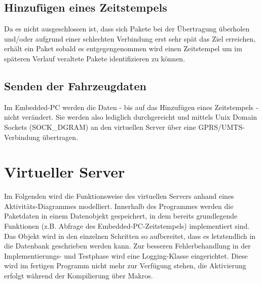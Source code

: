 \documentclass[fontsize = 12pt, paper = a4]{scrreprt}
\begin{document}
\subsection{Hinzufügen eines Zeitstempels}

Da es nicht ausgeschlossen ist, dass sich Pakete bei der Übertragung überholen und/oder aufgrund einer schlechten Verbindung erst sehr spät das Ziel erreichen, erhält ein Paket sobald es entgegengenommen wird einen Zeitstempel um im späteren Verlauf veraltete Pakete identifizieren zu können. 

\subsection{Senden der Fahrzeugdaten}

Im Embedded-PC werden die Daten - bis auf das Hinzufügen eines Zeitstempels - nicht verändert. Sie werden also lediglich durchgereicht und mittels Unix Domain Sockets (SOCK\_DGRAM) an den virtuellen Server über eine GPRS/UMTS-Verbindung übertragen. 

\section{Virtueller Server}

Im Folgenden wird die Funktionsweise des virtuellen Servers anhand eines Aktivitäts-Diagrammes modelliert. Innerhalb des Programmes werden die Paketdaten in einem Datenobjekt gespeichert, in dem bereits grundlegende Funktionen (z.B. Abfrage des Embedded-PC-Zeitstempels) implementiert sind. Das Objekt wird in den einzelnen Schritten so aufbereitet, dass es letztendlich in die Datenbank geschrieben werden kann. Zur besseren Fehlerbehandlung in der Implementierungs- und Testphase wird eine Logging-Klasse eingerichtet. Diese wird im fertigen Programm nicht mehr zur Verfügung stehen, die Aktivierung erfolgt während der Kompilierung über Makros. \\
\end{document}
